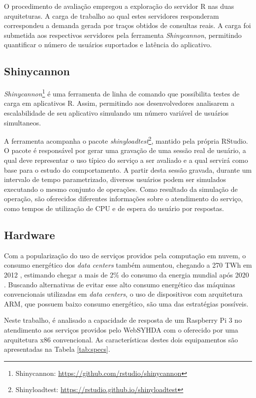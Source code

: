 \documentclass[12pt,english,brazil]{article}
\begin{document}
O procedimento de avaliação empregou a exploração do servidor R nas duas arquiteturas. A carga de trabalho ao qual estes servidores responderam correspondeu a demanda gerada por traços obtidos de consultas reais. A carga foi submetida aos respectivos servidores pela  ferramenta \emph{Shinycannon}, permitindo quantificar o número de usuários suportados e latência do aplicativo.


\subsection{Shinycannon} \label{sec:Shinycannon}

\textit{Shinycannon}\footnote{Shinycannon: \url{https://github.com/rstudio/shinycannon}} é uma ferramenta de linha de comando que possibilita testes de carga em aplicativos R. Assim, permitindo aos desenvolvedores analisarem a escalabilidade de seu aplicativo simulando um número variável de usuários simultaneos.

A ferramenta acompanha o pacote \textit{shinyloadtest}\footnote{Shinyloadtest: \url{https://rstudio.github.io/shinyloadtest}}, mantido pela própria RStudio. O pacote é responsável por gerar uma gravação de uma sessão real de usuário, a qual deve representar o uso típico do serviço a ser avaliado \cite{shinyloadtest} e a qual servirá como base para o estudo do comportamento. A partir desta sessão gravada, durante um intervalo de tempo parametrizado, diversos usuários podem ser simulados executando o mesmo conjunto de operações. Como resultado da simulação de operação, são oferecidos diferentes informações sobre o atendimento do serviço, como tempos de utilização de CPU e de espera do usuário por respostas.

\subsection{Hardware}\label{sec:Hardware}
Com a popularização do uso de serviços providos pela computação em nuvem, o consumo energético dos \emph{data centers} também aumentou, chegando a 270 TWh em 2012 \cite{VanHeddeghem:2014:TWI:2657027.2657141}, estimando chegar a mais de 2\% do consumo da energia mundial após 2020 \cite{energy}. Buscando alternativas de evitar esse alto consumo energético das máquinas convencionais utilizadas em \emph{data centers}, o uso de dispositivos com arquitetura ARM, que possuem baixo consumo energético, são uma das estratégias possíveis.

Neste trabalho, é analisado a capacidade de resposta de um Raspberry Pi 3 no atendimento aos serviços providos pelo WebSYHDA com o oferecido por uma arquitetura x86 convencional. As características destes dois equipamentos são apresentadas na Tabela \ref{tab:specs}. 
\end{document}
